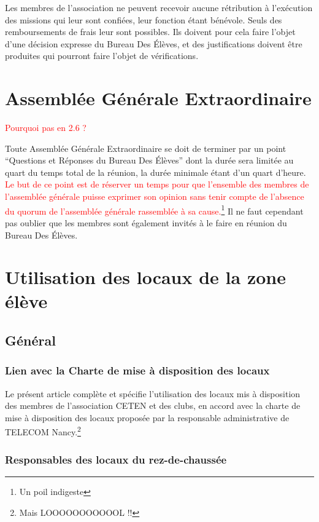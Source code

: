 \documentclass{article} %
\begin{document}
			Les membres de l’association ne peuvent recevoir aucune rétribution
			à l'exécution des missions qui leur sont confiées, leur fonction
			étant bénévole. Seuls des remboursements de frais leur sont
			possibles. Ils doivent pour cela faire l'objet d'une décision
			expresse du Bureau Des Élèves, et des justifications doivent être
			produites qui pourront faire l'objet de vérifications.

	\section{Assemblée Générale Extraordinaire}

		\textcolor{red}{Pourquoi pas en 2.6 ?}

		Toute Assemblée Générale Extraordinaire se doit de terminer par un point
		“Questions et Réponses du Bureau Des Élèves” dont la durée sera limitée
		au quart du temps total de la réunion, la durée minimale étant d’un
		quart d’heure. \textcolor{red}{Le but de ce point est de réserver un
		temps pour que l’ensemble des membres de l’assemblée générale puisse
		exprimer son opinion sans tenir compte de l’absence du quorum de
		l’assemblée générale rassemblée à sa cause.}\footnote{Un poil indigeste}
		Il ne faut cependant pas oublier que les membres sont également invités
		à le faire en réunion du Bureau Des Élèves.

	\section{Utilisation des locaux de la zone élève}
		
		\subsection{Général}

			\subsubsection{Lien avec la Charte de mise à disposition des locaux}

				Le présent article complète et spécifie l’utilisation des locaux
				mis à disposition des membres de l’association CETEN et des
				clubs, en accord avec la charte de mise à disposition des locaux
				proposée par la responsable administrative de TELECOM
				Nancy.\footnote{Mais LOOOOOOOOOOOL !!}

			\subsubsection{Responsables des locaux du rez-de-chaussée}
\end{document}
